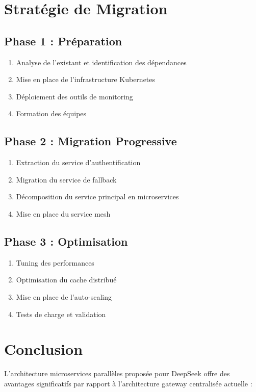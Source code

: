 \documentclass[12pt,a4paper]{article}
\begin{document}
\section{Stratégie de Migration}

\subsection{Phase 1 : Préparation}
\begin{enumerate}
    \item Analyse de l'existant et identification des dépendances
    \item Mise en place de l'infrastructure Kubernetes
    \item Déploiement des outils de monitoring
    \item Formation des équipes
\end{enumerate}

\subsection{Phase 2 : Migration Progressive}
\begin{enumerate}
    \item Extraction du service d'authentification
    \item Migration du service de fallback
    \item Décomposition du service principal en microservices
    \item Mise en place du service mesh
\end{enumerate}

\subsection{Phase 3 : Optimisation}
\begin{enumerate}
    \item Tuning des performances
    \item Optimisation du cache distribué
    \item Mise en place de l'auto-scaling
    \item Tests de charge et validation
\end{enumerate}

\section{Conclusion}

L'architecture microservices parallèles proposée pour DeepSeek offre des avantages significatifs par rapport à l'architecture gateway centralisée actuelle :
\end{document}
